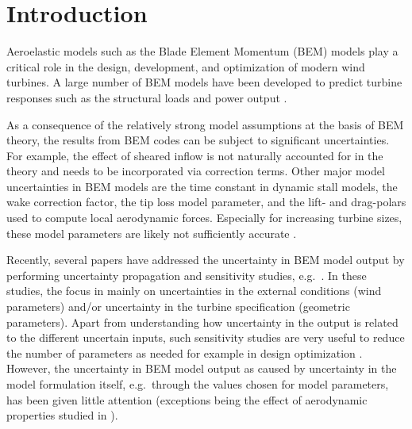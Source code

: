 
\section{Introduction}
Aeroelastic models such as the Blade Element Momentum (BEM) models \cite{HandBook} play a critical role in the design, development, and optimization of modern wind turbines. A large number of BEM models have been developed to predict turbine responses such as the structural loads and power output \cite{Vorpahl2013}. 

As a consequence of the relatively strong model assumptions at the basis of BEM theory, the results from BEM codes can be subject to significant uncertainties. For example, the effect of sheared inflow \cite{Madsen2012} is not naturally accounted for in the theory and needs to be incorporated via correction terms. Other major model uncertainties in BEM models are the time constant in dynamic stall models, the wake correction factor, the tip loss model parameter, and the lift- and drag-polars used to compute local aerodynamic forces. Especially for increasing turbine sizes, these model parameters are likely not sufficiently accurate \cite{Sayed2019}. 

Recently, several papers have addressed the uncertainty in BEM model output by performing uncertainty propagation and sensitivity studies, e.g.\ \cite{Echeverria2017,Matthaus2017,Murcia2018,Robertson2018,Bos2019a}. In these studies, the focus in mainly on uncertainties in the external conditions (wind parameters) and/or uncertainty in the turbine specification (geometric parameters). Apart from understanding how uncertainty in the output is related to the different uncertain inputs, such sensitivity studies are very useful to reduce the number of parameters as needed for example in design optimization \cite{Echeverria2017}. However, the uncertainty in BEM model output as caused by uncertainty in the model formulation itself, e.g.\ through the values chosen for model parameters, has been given little attention (exceptions being the effect of aerodynamic properties studied in \cite{Bortolotti2019,Matthaus2017}).

